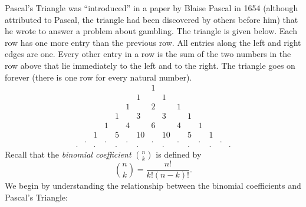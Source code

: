 \documentclass[letterpaper,12pt]{article}
\theoremstyle{definition}
\begin{document}
Pascal's Triangle was ``introduced'' in a paper by Blaise Pascal in 1654 (although attributed to Pascal, the triangle had been discovered by others before him) that he wrote to answer a problem about gambling. The triangle is given below. Each row has one more entry than the previous row. All entries along the left and right edges are one. Every other entry in a row is the sum of the two numbers in the row above that lie immediately to the left and to the right. The triangle goes on forever (there is one row for every natural number).
\[
 \begin{array}{ccccccccccccccc}
  &&&&&&&1&&&&&&&\\
&&&&&&1&&1&&&&&&\\
&&&&&1&&2&&1&&&&&\\
&&&&1&&3&&3&&1&&&&\\
&&&1&&4&&6&&4&&1&&&\\
&&1&&5&&10&&10&&5&&1\\
&.&&.&&.&&.&&.&&.&&.&\\
.&&.&&.&&.&&.&&.&&.&&.
 \end{array}
\]
Recall that the {\em binomial coefficient} $\binom{n}{k}$ is defined by
\[
 \binom{n}{k} = \frac{n!}{k!(n-k)!}.
\]
We begin by understanding the relationship between the binomial coefficients and Pascal's Triangle:
\end{document}
